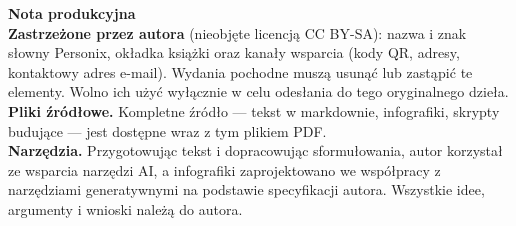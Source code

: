 \clearpage
\thispagestyle{empty}
\begin{flushleft}\small\sffamily
\textbf{Nota produkcyjna}\\[1.2em]

\textbf{Zastrzeżone przez autora} (nieobjęte licencją CC BY-SA): nazwa i znak
słowny Personix, okładka książki oraz kanały wsparcia (kody QR, adresy,
kontaktowy adres e-mail). Wydania pochodne muszą usunąć lub zastąpić te
elementy. Wolno ich użyć wyłącznie w celu odesłania do tego oryginalnego
dzieła.\\[1.2em]

\textbf{Pliki źródłowe.} Kompletne źródło --- tekst w markdownie, infografiki,
skrypty budujące --- jest dostępne wraz z tym plikiem PDF.\\[1.2em]

\textbf{Narzędzia.} Przygotowując tekst i dopracowując sformułowania, autor
korzystał ze wsparcia narzędzi AI, a infografiki zaprojektowano we współpracy
z narzędziami generatywnymi na podstawie specyfikacji autora. Wszystkie idee,
argumenty i wnioski należą do autora.
\end{flushleft}
\clearpage
